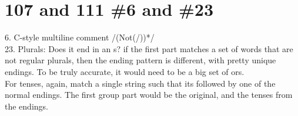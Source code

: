 \documentclass[11pt]{article}
\begin{document}
\section{107 and 111 \#6 and \#23}
    6. C-style multiline comment
    /\*(\*Not(/))*\*/ \\
    23. Plurals: Does it end in an s? if the first part matches a set of words that are not regular plurals, then the ending pattern is different, with pretty unique endings. To be truly accurate, it would need to be a big set of ors. \\
    For tenses, again, match a single string such that its followed by one of the normal endings. The first group part would be the original, and the tenses from the endings.
\end{document}
